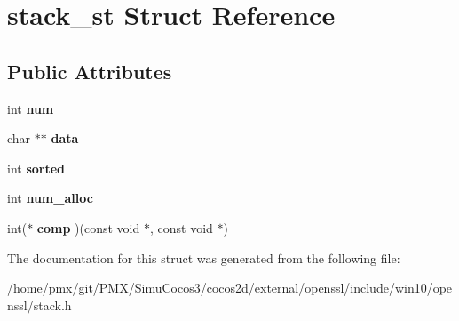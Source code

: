 \hypertarget{structstack__st}{}\section{stack\+\_\+st Struct Reference}
\label{structstack__st}
\subsection*{Public Attributes}
\begin{DoxyCompactItemize}
\item 
\mbox{\label{structstack__st_af60cc588694f5798623d33fe70946748}} 
int {\bfseries num}
\item 
\mbox{\label{structstack__st_af7d6fc34731b1971666de50613a0fb53}} 
char $\ast$$\ast$ {\bfseries data}
\item 
\mbox{\label{structstack__st_a8bc2f5dfd119fa8339637dfbca8251d9}} 
int {\bfseries sorted}
\item 
\mbox{\label{structstack__st_a4ad771fe5551133410de60b2e8b2028d}} 
int {\bfseries num\+\_\+alloc}
\item 
\mbox{\label{structstack__st_a91ae59f4cee454d2eef6dc1635e9cf46}} 
int($\ast$ {\bfseries comp} )(const void $\ast$, const void $\ast$)
\end{DoxyCompactItemize}


The documentation for this struct was generated from the following file\+:\begin{DoxyCompactItemize}
\item 
/home/pmx/git/\+P\+M\+X/\+Simu\+Cocos3/cocos2d/external/openssl/include/win10/openssl/stack.\+h\end{DoxyCompactItemize}
